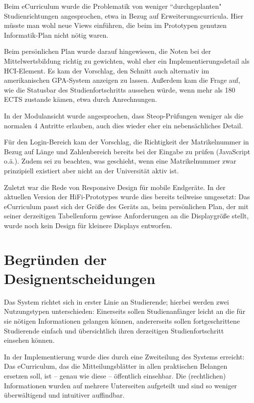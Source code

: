 \documentclass[a4paper,10pt]{scrartcl}
\begin{document}
Beim eCurriculum wurde die Problematik von weniger ``durchgeplanten" Studienrichtungen angesprochen, etwa in Bezug auf Erweiterungscurricula. Hier müsste man wohl neue Views einführen, die beim im Prototypen genutzen Informatik-Plan nicht nötig waren.

Beim persönlichen Plan wurde darauf hingewiesen, die Noten bei der Mittelwertsbildung richtig zu gewichten, wohl eher ein Implementierungsdetail als HCI-Element. Es kam der Vorschlag, den Schnitt auch alternativ im amerikanischen GPA-System anzeigen zu lassen. Außerdem kam die Frage auf, wie die Statusbar des Studienfortschritts aussehen würde, wenn mehr als 180 ECTS zustande kämen, etwa durch Anrechnungen.

In der Modulansicht wurde angesprochen, dass Steop-Prüfungen weniger als die normalen 4 Antritte erlauben, auch dies wieder eher ein nebensächliches Detail.

Für den Login-Bereich kam der Vorschlag, die Richtigkeit der Matrikelnummer in Bezug auf Länge und Zahlenbereich bereits bei der Eingabe zu prüfen (JavaScript o.ä.). Zudem sei zu beachten, was geschieht, wenn eine Matrikelnummer zwar prinzipiell existiert aber nicht an der Universität aktiv ist.

Zuletzt war die Rede von Responsive Design für mobile Endgeräte. In der aktuellen Version der HiFi-Prototypes wurde dies bereits teilweise umgesetzt: Das eCurriculum passt sich der Größe des Geräts an, beim persönlichen Plan, der mit seiner derzeitigen Tabellenform gewisse Anforderungen an die Displaygröße stellt, wurde noch kein Design für kleinere Displays entworfen.

\section*{Begründen der Designentscheidungen}
Das System richtet sich in erster Linie an Studierende; hierbei werden zwei Nutzungstypen unterschieden: Einerseits sollen Studienanfänger leicht an die für sie nötigen Informationen gelangen können, andererseits sollen fortgeschrittene Studierende einfach und übersichtlich ihren derzeitigen Studienfortschritt einsehen können.

In der Implementierung wurde dies durch eine Zweiteilung des Systems erreicht: Das eCurriculum, das die Mitteilungsblätter in allen praktischen Belangen ersetzen soll, ist – genau wie diese – öffentlich einsehbar. Die (rechtlichen) Informationen wurden auf mehrere Unterseiten aufgeteilt und sind so weniger überwältigend und intuitiver auffindbar.
\end{document}
